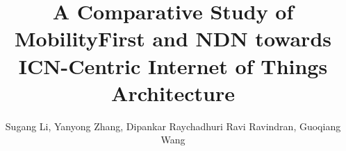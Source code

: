 \documentclass{sig-alternate-10pt}
\begin{document}
\title{A Comparative Study of MobilityFirst and NDN towards ICN-Centric Internet of Things Architecture}

\author{
\alignauthor
Sugang Li\winlab, Yanyong Zhang\winlab, Dipankar Raychadhuri\winlab
\vspace{2mm}
Ravi Ravindran\huawei, Guoqiang Wang\huawei
        \vspace{2mm}
          \vspace{1mm}
}

\maketitle


%
%




%
%

\balance
\scriptsize

%
\end{document}

